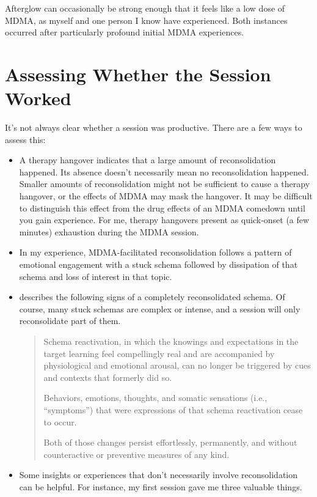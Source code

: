 \documentclass[11pt,oneside]{book}
\begin{document}
Afterglow can occasionally be strong enough that it feels like a low dose of MDMA, as myself and one person I know have experienced. Both instances occurred after particularly profound initial MDMA experiences.

\section{Assessing Whether the Session Worked}
It's not always clear whether a session was productive. There are a few ways to assess this:
\begin{itemize}
    \item A therapy hangover indicates that a large amount of reconsolidation happened. Its absence doesn't necessarily mean no reconsolidation happened. Smaller amounts of reconsolidation might not be sufficient to cause a therapy hangover, or the effects of MDMA may mask the hangover. It may be difficult to distinguish this effect from the drug effects of an MDMA comedown until you gain experience. For me, therapy hangovers present as quick-onset (a few minutes) exhaustion during the MDMA session.
    \item In my experience, MDMA-facilitated reconsolidation follows a pattern of emotional engagement with a stuck schema followed by dissipation of that schema and loss of interest in that topic.
    \item \textcite[p. 22]{eckerUnlocking} describes the following signs of a completely reconsolidated schema. Of course, many stuck schemas are complex or intense, and a session will only reconsolidate part of them.
    \begin{quotation}
        Schema reactivation, in which the knowings and expectations in the target learning feel compellingly real and are accompanied by physiological and emotional arousal, can no longer be triggered by cues and contexts that formerly did so.

        Behaviors, emotions, thoughts, and somatic sensations (i.e., \enquote{symptoms}) that were expressions of that schema reactivation cease to occur.

        Both of those changes persist effortlessly, permanently, and without counteractive or preventive measures of any kind.
    \end{quotation}
    \item Some insights or experiences that don't necessarily involve reconsolidation can be helpful. For instance, my first session gave me three valuable things.
    

\end{itemize}
\end{document}
